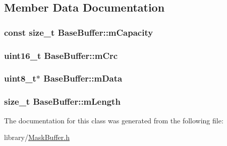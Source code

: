 \subsection{Member Data Documentation}
\hypertarget{class_base_buffer_a667e748b2f88e0c3ac43730f1ced3616}{
\subsubsection[{m\-Capacity}]{\setlength{\rightskip}{0pt plus 5cm}const size\-\_\-t Base\-Buffer\-::m\-Capacity\hspace{0.3cm}{\ttfamily [protected]}}}\label{class_base_buffer_a667e748b2f88e0c3ac43730f1ced3616}
\hypertarget{class_base_buffer_aaae3bf69d9096078814b3fd769803914}{
\subsubsection[{m\-Crc}]{\setlength{\rightskip}{0pt plus 5cm}uint16\-\_\-t Base\-Buffer\-::m\-Crc\hspace{0.3cm}{\ttfamily [protected]}}}\label{class_base_buffer_aaae3bf69d9096078814b3fd769803914}
\hypertarget{class_base_buffer_a1dad25def957cb8c95ce874e4e6531c9}{
\subsubsection[{m\-Data}]{\setlength{\rightskip}{0pt plus 5cm}uint8\-\_\-t$\ast$ Base\-Buffer\-::m\-Data\hspace{0.3cm}{\ttfamily [protected]}}}\label{class_base_buffer_a1dad25def957cb8c95ce874e4e6531c9}
\hypertarget{class_base_buffer_a18cc80c360b914585278da7233af540c}{
\subsubsection[{m\-Length}]{\setlength{\rightskip}{0pt plus 5cm}size\-\_\-t Base\-Buffer\-::m\-Length\hspace{0.3cm}{\ttfamily [protected]}}}\label{class_base_buffer_a18cc80c360b914585278da7233af540c}


The documentation for this class was generated from the following file\-:\begin{DoxyCompactItemize}
\item 
library/\hyperlink{_mask_buffer_8h}{Mask\-Buffer.\-h}\end{DoxyCompactItemize}
